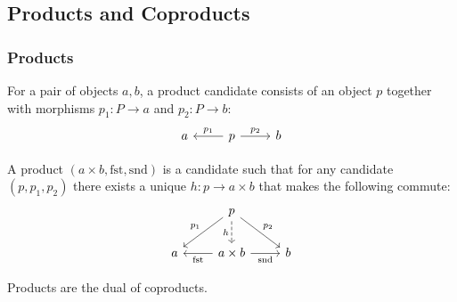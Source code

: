 \subsection{Products and Coproducts}

\subsubsection*{Products}

\begin{definition}

	For a pair of objects $a, b$, a product candidate consists of an object $p$
	together with morphisms $p_1: P\to a$ and $p_2:P\to b$:
	\[\begin{tikzcd}[ampersand replacement=\&]
		a \& p \& b
		\arrow["{p_1}"', from=1-2, to=1-1]
		\arrow["{p_2}", from=1-2, to=1-3]
	\end{tikzcd}\]

	A product $(a\times b, \mathrm{fst}, \mathrm{snd})$ is a candidate such that
	for any candidate $(p, p_1, p_2)$ there exists a unique $h: p\to a\times b$
	that makes the following commute:
	\parencite{leinster:basic_category_theory}
	\[\begin{tikzcd}[ampersand replacement=\&]
		\& p \\
		a \& {a\times b} \& b
		\arrow["{\mathrm{fst}}", from=2-2, to=2-1]
		\arrow["{\mathrm{snd}}"', from=2-2, to=2-3]
		\arrow["{p_1}"', from=1-2, to=2-1]
		\arrow["{p_2}", from=1-2, to=2-3]
		\arrow["h"', dashed, from=1-2, to=2-2]
	\end{tikzcd}\]
\end{definition}

\begin{remark}
	Products are the dual of coproducts.
\end{remark}


